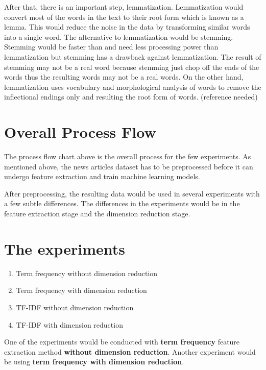 After that, there is an important step, lemmatization. Lemmatization would convert most of the words in the text to their root form which is known as a lemma. This would reduce the noise in the data by transforming similar words into a single word. The alternative to lemmatization would be stemming. Stemming would be faster than and need less processing power than lemmatization but stemming has a drawback against lemmatization. The result of stemming may not be a real word because stemming just chop off the ends of the words thus the resulting words may not be a real words. On the other hand, lemmatization uses vocabulary and morphological analysis of words to remove the inflectional endings only and resulting the root form of words.
(reference needed)


\section{Overall Process Flow}

The process flow chart above is the overall process for the few experiments. As mentioned above, the news articles dataset has to be preprocessed before it can undergo feature extraction and train machine learning models.

After preprocessing, the resulting data would be used in several experiments with a few subtle differences.
The differences in the experiments would be in the feature extraction stage and the dimension reduction stage. 

\section{The experiments}
\begin{enumerate}
	\item Term frequency without dimension reduction
	\item Term frequency with dimension reduction
	\item TF-IDF without dimension reduction
	\item TF-IDF with dimension reduction
\end{enumerate}
One of the experiments would be conducted with \textbf{term frequency} feature extraction method \textbf{without dimension reduction}. Another experiment would be using \textbf{term frequency with dimension reduction}.


